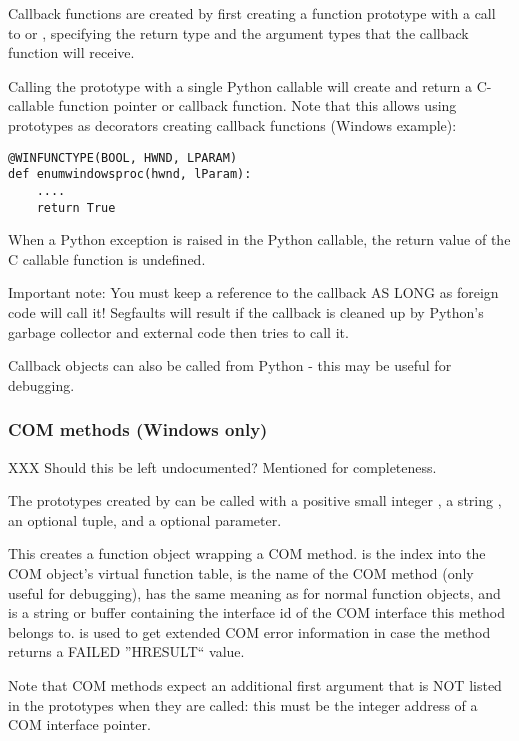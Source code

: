 Callback functions are created by first creating a function prototype
with a call to  or , specifying the return
type and the argument types that the callback function will receive.

Calling the prototype with a single Python callable will create and
return a C-callable function pointer or callback function.  Note that
this allows using prototypes as decorators creating callback
functions (Windows example):
\begin{verbatim}
@WINFUNCTYPE(BOOL, HWND, LPARAM)
def enumwindowsproc(hwnd, lParam):
    ....
    return True
\end{verbatim}

When a Python exception is raised in the Python callable, the return
value of the C callable function is undefined.

Important note: You must keep a reference to the callback AS LONG as
foreign code will call it!  Segfaults will result if the callback is
cleaned up by Python's garbage collector and external code then
tries to call it.

Callback objects can also be called from Python - this may be useful
for debugging.


\subsubsection{COM methods (Windows only)\label{ctypes-com-methods}}

XXX Should this be left undocumented?  Mentioned for completeness.

The prototypes created by  can be called with a
positive small integer , a string , an optional
 tuple, and a optional  parameter.

This creates a function object wrapping a COM method.   is
the index into the COM object's virtual function table,  is
the name of the COM method (only useful for debugging), 
has the same meaning as for normal function objects, and  is a
string or buffer containing the interface id of the COM interface
this method belongs to.   is used to get extended COM error
information in case the method returns a FAILED ''HRESULT`` value.

Note that COM methods expect an additional first argument that is NOT
listed in the prototypes  when they are called: this must
be the integer address of a COM interface pointer.


